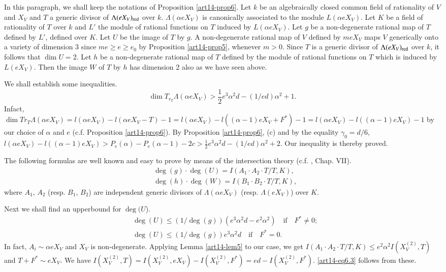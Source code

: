 In this paragraph, we shall keep the notations of Proposition \ref{art14-prop6}. Let $k$ be an algebraically closed common field of rationality of $V$ and $X_{V}$ and $T$ a generic divisor of $\Lambda(eX_{V})_{\operatorname{\mathrm{red}}}$ over $k$. $\Lambda(\alpha eX_{V})$ is canonically associated to the module $L(\alpha eX_{V})$. Let $K$ be a field of rationality of $T$ over $k$ and $L'$ the module of rational functions on $T$ induced by $L(\alpha eX_{V})$. Let $g$ be a non-degenerate rational map of $T$ defined by $L'$, defined over $K$. Let $U$ be the image of $T$ by $g$. A non-degenerate rational map of $V$ defined by $meX_{V}$ maps $V$ generically onto a variety of dimension 3 since $me\geq e\geq e_{0}$ by Proposition \ref{art14-prop5}, whenever $m>0$. Since $T$ is a generic divisor of $\Lambda(eX_{V})_{\operatorname{\mathrm{red}}}$ over $k$, it follows that $\dim U=2$. Let $h$ be a non-degenerate rational map of $T$ defined by the module of rational functions on $T$ which is induced by $L(eX_{V})$. Then the image $W$ of $T$ by $h$ has dimension 2 also as we have seen above.

We shall establish some inequalities.
\begin{equation*}
\dim T_{r_{T}}\Lambda (\alpha eX_{V})>\frac{1}{2}e^{3}\alpha^{2}d-(1/ed)\alpha^{2}+1.\tag{6.1}\label{art14-eq6.1}
\end{equation*}
In\pageoriginale fact, $\dim Tr_{T}\Lambda(\alpha eX_{V})=l(\alpha eX_{V})-l(\alpha eX_{V}-T)-1=l(\alpha eX_{V})-l((\alpha-1)eX_{V}+F^{*})-1=l(\alpha eX_{V})-l((\alpha-1)eX_{V})-1$ by our choice of $\alpha$ and $e$ (c.f. Proposition \ref{art14-prop6}). By Proposition \ref{art14-prop6}, (c) and by the equality $\gamma_{0}=d/6$, $l(\alpha eX_{V})-l((\alpha-1)eX_{V})>P_{e}(\alpha)-P_{e}(\alpha-1)-2c>\frac{1}{2}e^{3}\alpha^{2}d-(1/ed)\alpha^{2}+2$. Our inequality is thereby proved.

The following formulas are well known and easy to prove by means of the intersection theory (c.f. \cite{art14-key25}, Chap. VII).
\begin{align*}
& \deg (g)\cdot \deg (U)=I(A_{1}\cdot A_{2}\cdot T/T,K),\\
& \deg (h)\cdot \deg (W) = I(B_{1}\cdot B_{2}\cdot T/T,K),\tag{6.2}\label{art14-eq6.2}
\end{align*}
where $A_{1}$, $A_{2}$ (resp. $B_{1}$, $B_{2}$) are independent generic divisors of $\Lambda (\alpha eX_{V})$ (resp. $\Lambda (eX_{V})$) over $K$.

Next we shall find an upperbound for $\deg(U$).
\begin{align*}
& \deg (U)\leq (1/\deg(g))(e^{3}\alpha^{2}d-e^{2}\alpha^{2})\text{~~ if~~ } F^{*}\neq 0;\tag{6.3}\label{art14-eq6.3}\\
& \deg (U)\leq (1/\deg (g))e^{3}\alpha^{2}d\text{~~ if~~ } F^{*}=0.
\end{align*}
In fact, $A_{i}\sim \alpha eX_{V}$ and $X_{V}$ is non-degenerate. Applying Lemma \ref{art14-lem5} to our case, we get $I(A_{1}\cdot A_{2}\cdot T/T,K)\leq e^{2}\alpha^{2}I(X^{(2)}_{V}, T)$ and $T+F^{*}\sim eX_{V}$. We have $I(X^{(2)}_{V},T)=I(X^{(2)}_{V},eX_{V})-I(X^{(2)}_{V},F^{*})=ed-I(X^{(2)}_{V},F^{*})$. \eqref{art14-eq6.3} follows from these.

